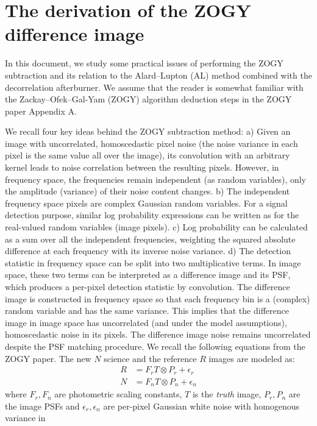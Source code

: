 \section{The derivation of the ZOGY difference image}
%
\par In this document, we study some practical issues of performing
the ZOGY subtraction and its relation to the Alard--Lupton (AL) method
\citep{AL1998} combined with the decorrelation afterburner. We assume
that the reader is somewhat familiar with the Zackay--Ofek--Gal-Yam
(ZOGY) algorithm deduction steps in the ZOGY
paper\citep{ZOGY2016} Appendix A.
%
\par We recall four key ideas behind the ZOGY subtraction method: a) Given
an image with uncorrelated, homoscedastic pixel noise (the noise variance in
each pixel is the same value all over the image), its convolution with an
arbitrary kernel leads to noise correlation between the resulting
pixels. However, in frequency space, the frequencies remain independent (as
random variables), only the amplitude (variance) of their noise content
changes. b) The independent frequency space pixels are complex Gaussian
random variables. For a signal detection purpose, similar log
probability expressions can be written as for the real-valued random
variables (image pixels). c) Log probability can be calculated as a sum over
all the independent frequencies, weighting the squared absolute difference
at each frequency with its inverse noise variance. d) The detection
statistic in frequency space can be split into two multiplicative terms. In
image space, these two terms can be interpreted as a difference image and
its PSF, which produces a per-pixel detection statistic by convolution. The
difference image is constructed in frequency space so that each frequency
bin is a (complex) random variable and has the same variance. This implies
that the difference image in image space has uncorrelated (and under the
model assumptions), homoscedastic noise in its pixels. The difference image
noise remains uncorrelated despite the PSF matching procedure.
%
We recall the following equations from the ZOGY paper.
The new \(N\) science and the reference \(R\) images are modeled as:
\begin{align}
R &= F_rT\otimes P_r + \epsilon_r\\
N &= F_nT\otimes P_n + \epsilon_n
\label{eq:N}
\end{align}
where \(F_r, F_n\) are photometric scaling constants, \(T\) is the
\emph{truth} image, \(P_r, P_n\) are the image PSFs and \(\epsilon_r,
\epsilon_n\) are per-pixel Gaussian white noise with homogenous variance in
